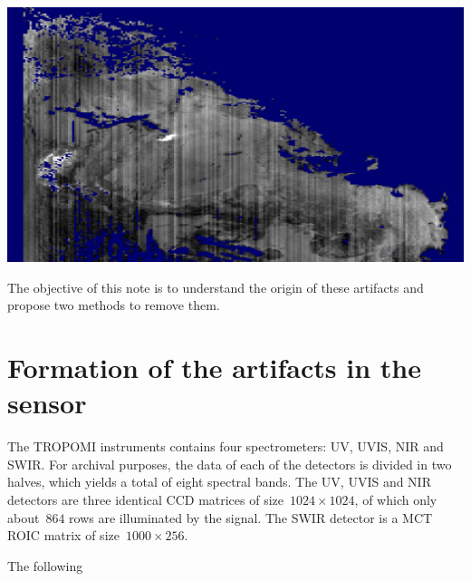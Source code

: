 \documentclass[a4paper]{article}    %
\theoremstyle{note}
\theoremstyle{plain}
\begin{document}
\includegraphics[width=.8\textwidth]{f/cropblue.png}

The objective of this note is to understand the origin of these artifacts and
propose two methods to remove them.

\section{Formation of the artifacts in the sensor}

The TROPOMI instruments contains four spectrometers: UV, UVIS, NIR and SWIR.
For archival purposes, the data of each of the detectors is divided in two
halves, which yields a total of eight spectral bands.  The UV, UVIS and NIR
detectors are three identical CCD matrices of size~$1024\times 1024$, of
which only about~$864$ rows are illuminated by the signal.  The SWIR detector
is a MCT ROIC matrix of size~$1000\times 256$.

The following 
\end{document}
